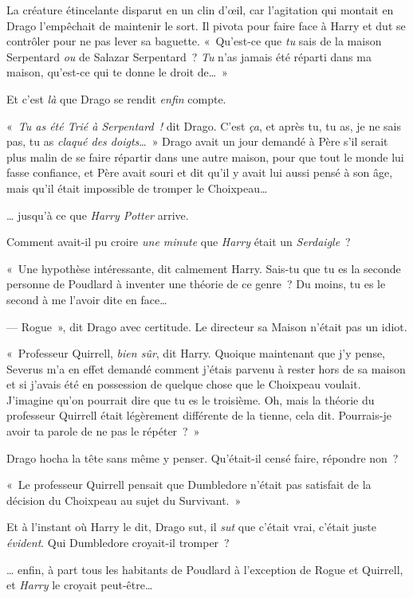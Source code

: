 La créature étincelante disparut en un clin d'œil, car l'agitation qui montait en Drago l'empêchait de maintenir le sort. Il pivota pour faire face à Harry et dut se contrôler pour ne pas lever sa baguette. «~Qu'est-ce que \emph{tu} sais de la maison Serpentard \emph{ou} de Salazar Serpentard~? \emph{Tu} n'as jamais été réparti dans ma maison, qu'est-ce qui te donne le droit de…~»

Et c'est \emph{là} que Drago se rendit \emph{enfin} compte.

«~\emph{Tu as été Trié à Serpentard~! } dit Drago. C'est \emph{ça}, et après tu, tu as, je ne sais pas, tu as \emph{claqué des doigts}…~» Drago avait un jour demandé à Père s'il serait plus malin de se faire répartir dans une autre maison, pour que tout le monde lui fasse confiance, et Père avait souri et dit qu'il y avait lui aussi pensé à son âge, mais qu'il était impossible de tromper le Choixpeau…

… jusqu'à ce que \emph{Harry Potter} arrive.

Comment avait-il pu croire \emph{une minute} que \emph{Harry} était un \emph{Serdaigle}~?

«~Une hypothèse intéressante, dit calmement Harry. Sais-tu que tu es la seconde personne de Poudlard à inventer une théorie de ce genre~? Du moins, tu es le second à me l'avoir dite en face…

--- Rogue~», dit Drago avec certitude. Le directeur sa Maison n'était pas un idiot.

«~Professeur Quirrell, \emph{bien sûr}, dit Harry. Quoique maintenant que j'y pense, Severus m'a en effet demandé comment j'étais parvenu à rester hors de sa maison et si j'avais été en possession de quelque chose que le Choixpeau voulait. J'imagine qu'on pourrait dire que tu es le troisième. Oh, mais la théorie du professeur Quirrell était légèrement différente de la tienne, cela dit. Pourrais-je avoir ta parole de ne pas le répéter~?~»

Drago hocha la tête sans même y penser. Qu'était-il censé faire, répondre non~?

«~Le professeur Quirrell pensait que Dumbledore n'était pas satisfait de la décision du Choixpeau au sujet du Survivant.~»

Et à l'instant où Harry le dit, Drago sut, il \emph{sut} que c'était vrai, c'était juste \emph{évident}. Qui Dumbledore croyait-il tromper~?

… enfin, à part tous les habitants de Poudlard à l'exception de Rogue et Quirrell, et \emph{Harry} le croyait peut-être…

